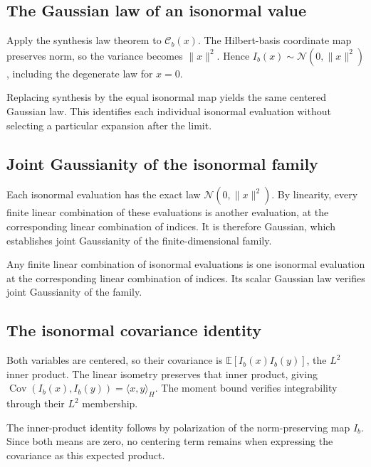\documentclass[11pt,a4paper]{article}
\begin{document}
\subsection{\texorpdfstring{The Gaussian law of an isonormal value}{The Gaussian law of an isonormal value}}


Apply the synthesis law theorem to \(\mathcal C_b(x)\). The Hilbert-basis coordinate map preserves norm, so the variance becomes \(\|x\|^2\). Hence \(I_b(x)\sim\mathcal N(0,\|x\|^2)\), including the degenerate law for \(x=0\).



Replacing synthesis by the equal isonormal map yields the same centered Gaussian law. This identifies each individual isonormal evaluation without selecting a particular expansion after the limit.


\subsection{\texorpdfstring{Joint Gaussianity of the isonormal family}{Joint Gaussianity of the isonormal family}}


Each isonormal evaluation has the exact law \(\mathcal N(0,\|x\|^2)\). By linearity, every finite linear combination of these evaluations is another evaluation, at the corresponding linear combination of indices. It is therefore Gaussian, which establishes joint Gaussianity of the finite-dimensional family.



Any finite linear combination of isonormal evaluations is one isonormal evaluation at the corresponding linear combination of indices. Its scalar Gaussian law verifies joint Gaussianity of the family.


\subsection{\texorpdfstring{The isonormal covariance identity}{The isonormal covariance identity}}


Both variables are centered, so their covariance is \(\mathbb E[I_b(x)I_b(y)]\), the \(L^2\) inner product. The linear isometry preserves that inner product, giving \(\operatorname{Cov}(I_b(x),I_b(y))=\langle x,y\rangle_H\). The moment bound verifies integrability through their \(L^2\) membership.



The inner-product identity follows by polarization of the norm-preserving map \(I_b\). Since both means are zero, no centering term remains when expressing the covariance as this expected product.
\end{document}
